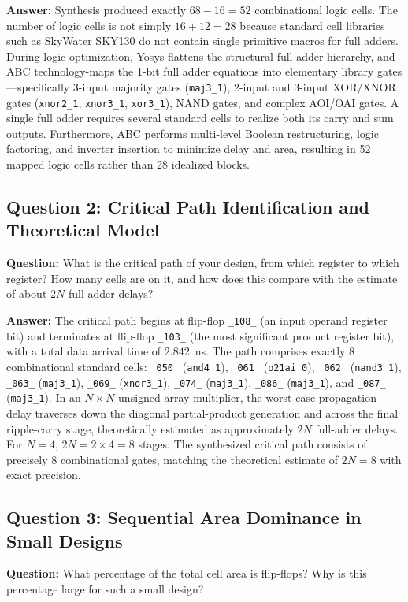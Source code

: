 \documentclass[12pt]{article}
\begin{document}
{\textbf{Answer:} 
Synthesis produced exactly $68 - 16 = 52$ combinational logic cells. The number of logic cells is not simply $16 + 12 = 28$ because standard cell libraries such as SkyWater SKY130 do not contain single primitive macros for full adders. During logic optimization, Yosys flattens the structural full adder hierarchy, and ABC technology-maps the 1-bit full adder equations into elementary library gates—specifically 3-input majority gates (\texttt{maj3\_1}), 2-input and 3-input XOR/XNOR gates (\texttt{xnor2\_1}, \texttt{xnor3\_1}, \texttt{xor3\_1}), NAND gates, and complex AOI/OAI gates. A single full adder requires several standard cells to realize both its carry and sum outputs. Furthermore, ABC performs multi-level Boolean restructuring, logic factoring, and inverter insertion to minimize delay and area, resulting in 52 mapped logic cells rather than 28 idealized blocks.

\subsection{Question 2: Critical Path Identification and Theoretical Model}
\textbf{Question:} What is the critical path of your design, from which register to which register? How many cells are on it, and how does this compare with the estimate of about $2N$ full-adder delays?

\textbf{Answer:} 
The critical path begins at flip-flop \texttt{\_108\_} (an input operand register bit) and terminates at flip-flop \texttt{\_103\_} (the most significant product register bit), with a total data arrival time of $2.842$~ns. The path comprises exactly 8 combinational standard cells: \texttt{\_050\_} (\texttt{and4\_1}), \texttt{\_061\_} (\texttt{o21ai\_0}), \texttt{\_062\_} (\texttt{nand3\_1}), \texttt{\_063\_} (\texttt{maj3\_1}), \texttt{\_069\_} (\texttt{xnor3\_1}), \texttt{\_074\_} (\texttt{maj3\_1}), \texttt{\_086\_} (\texttt{maj3\_1}), and \texttt{\_087\_} (\texttt{maj3\_1}). In an $N \times N$ unsigned array multiplier, the worst-case propagation delay traverses down the diagonal partial-product generation and across the final ripple-carry stage, theoretically estimated as approximately $2N$ full-adder delays. For $N = 4$, $2N = 2 \times 4 = 8$ stages. The synthesized critical path consists of precisely 8 combinational gates, matching the theoretical estimate of $2N = 8$ with exact precision.

\subsection{Question 3: Sequential Area Dominance in Small Designs}
\textbf{Question:} What percentage of the total cell area is flip-flops? Why is this percentage large for such a small design?

}
\end{document}
